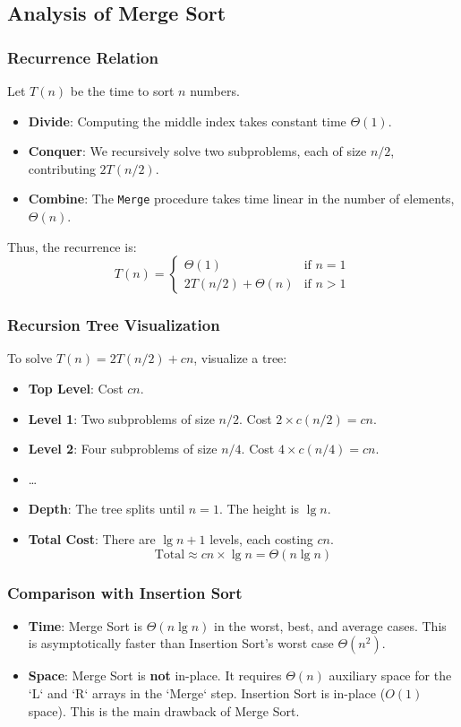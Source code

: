 \documentclass[12pt]{article}
\theoremstyle{blueplain}
\theoremstyle{bluedef}
\theoremstyle{blueremark}
\begin{document}
\subsection{Analysis of Merge Sort}

\subsubsection{Recurrence Relation}
Let $T(n)$ be the time to sort $n$ numbers.
\begin{itemize}
    \item \textbf{Divide}: Computing the middle index takes constant time $\Theta(1)$.
    \item \textbf{Conquer}: We recursively solve two subproblems, each of size $n/2$, contributing $2T(n/2)$.
    \item \textbf{Combine}: The \texttt{Merge} procedure takes time linear in the number of elements, $\Theta(n)$.
\end{itemize}
Thus, the recurrence is:
\[
    T(n) = \begin{cases}
        \Theta(1)           & \text{if } n=1   \\
        2T(n/2) + \Theta(n) & \text{if } n > 1
    \end{cases}
\]


\subsubsection{Recursion Tree Visualization}
To solve $T(n) = 2T(n/2) + cn$, visualize a tree:
\begin{itemize}
    \item \textbf{Top Level}: Cost $cn$.
    \item \textbf{Level 1}: Two subproblems of size $n/2$. Cost $2 \times c(n/2) = cn$.
    \item \textbf{Level 2}: Four subproblems of size $n/4$. Cost $4 \times c(n/4) = cn$.
    \item \dots
    \item \textbf{Depth}: The tree splits until $n=1$. The height is $\lg n$.
    \item \textbf{Total Cost}: There are $\lg n + 1$ levels, each costing $cn$.
          \[ \text{Total} \approx cn \times \lg n = \Theta(n \lg n) \]
\end{itemize}

\subsubsection{Comparison with Insertion Sort}
\begin{itemize}
    \item \textbf{Time}: Merge Sort is $\Theta(n \lg n)$ in the worst, best, and average cases. This is asymptotically faster than Insertion Sort's worst case $\Theta(n^2)$.
    \item \textbf{Space}: Merge Sort is \textbf{not} in-place. It requires $\Theta(n)$ auxiliary space for the `L` and `R` arrays in the `Merge` step. Insertion Sort is in-place ($O(1)$ space). This is the main drawback of Merge Sort.
\end{itemize}
\end{document}
